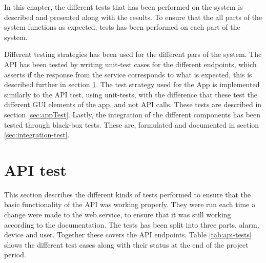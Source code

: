 In this chapter, the different tests that has been performed on the system is described and presented along with the results. To ensure that the all parts of the system functions as expected, tests has been performed on each part of the system.

Different testing strategies has been used for the different pars of the system. The API has been tested by writing unit-test cases for the different endpoints, which asserts if the response from the service corresponds to what is expected, this is described further in section \ref{sec:api-test}. The test strategy used for the App is implemented similarly to the API test, using unit-tests, with the difference that these test the different GUI elements of the app, and not API calls. These tests are described in section \ref{sec:appTest}. Lastly, the integration of the different components has been tested through black-box tests. These are, formulated and documented in section \ref{sec:integration-test}.

\section{API test}
\label{sec:api-test}
This section describes the different kinds of tests performed to ensure that the basic functionality of the API was working properly. They were run each time a change were made to the web service, to ensure that it was still working according to the documentation. The tests has been split into three parts, alarm, device and user. Together these covers the API endpoints. Table \ref{tab:api-tests} shows the different test cases along with their status at the end of the project period.

